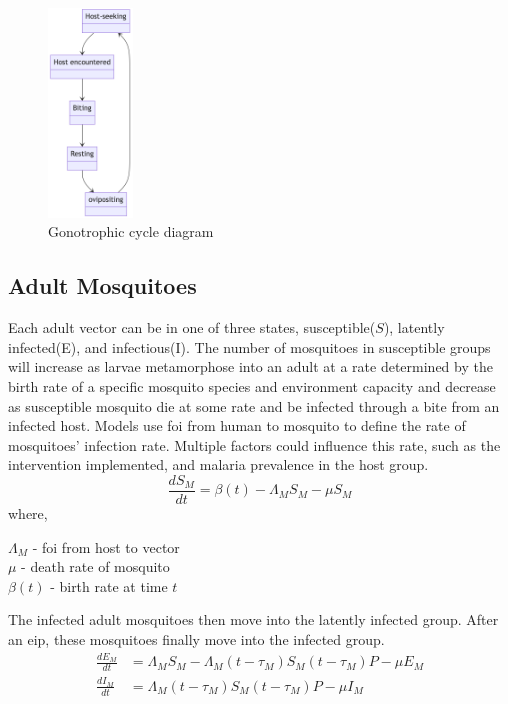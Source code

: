 \documentclass[a4paper, 12pt, twoside]{article}
\begin{document}
\begin{figure}[htpb]
	\centering
	\includegraphics[width=0.2\textwidth]{gonotrophic-cycle-diagram}
	\caption{Gonotrophic cycle diagram}
	\label{fig:gonotrophic-cycle-diagram}
\end{figure}

\subsection{Adult Mosquitoes}
Each adult vector can be in one of three states, susceptible($S$), latently infected(E), and infectious(I).
The number of mosquitoes in susceptible groups will increase as larvae metamorphose into an adult at a rate determined by the birth rate of a specific mosquito species and environment capacity and decrease as susceptible mosquito die at some rate and be infected through a bite from an infected host.
Models use \gls{foi} from human to mosquito to define the rate of mosquitoes' infection rate.
Multiple factors could influence this rate, such as the intervention implemented, and malaria prevalence in the host group.
\begin{equation}
  \frac{dS_M}{dt} = \beta(t) - \Lambda_M S_M - \mu S_M
\end{equation}
where,
\begin{centering}
  $\Lambda_M$ - \gls{foi} from host to vector \\
  $\mu$ - death rate of mosquito\\
  $\beta(t)$ - birth rate at time  $t$\\
\end{centering}

The infected adult mosquitoes then move into the latently infected group.
After an \gls{eip}, these mosquitoes finally move into the infected group.
\begin{align}
  \frac{dE_M}{dt} & = \Lambda_M S_M - \Lambda_M (t- \tau_M) S_M (t - \tau_M) P - \mu E_M\\
  \frac{dI_M}{dt} & = \Lambda_M (t- \tau_M) S_M (t - \tau_M) P - \mu I_M
\end{align}
\end{document}
